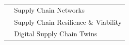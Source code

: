 

\renewcommand{\thefootnote}{\fnsymbol{footnote}}
\setcounter{footnote}{0}

\begin{longtable}[l]{@{}p{} p{}}
    & Supply Chain Networks \\
    & Supply Chain Resilience \& Viability \\
    & Digital Supply Chain Twins
\end{longtable}
